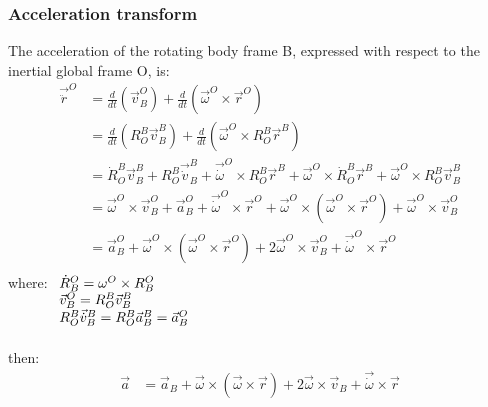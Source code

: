 \documentclass[12pt]{article}
\begin{document}
        \subsubsection{Acceleration transform}
            The acceleration of the rotating body frame B, expressed with respect to the inertial global frame O, is:
            \begin{equation}
                \begin{aligned}
                    \vec{\ddot{r}}^O & = \frac{d}{dt} \left(\vec{v}_B^O\right) + \frac{d}{dt} \left(\vec{\omega}^O \times \vec{r}^O\right) \\
                    & = \frac{d}{dt} \left(R^B_O \vec{v}_B^B\right) + \frac{d}{dt} \left(\vec{\omega}^O \times R^B_O \vec{r}^B\right) \\
                    & = \dot{R}^B_O \vec{v}_B^B + R^B_O \vec{\dot{v}}_B^B + \vec{\dot{\omega}}^O \times R^B_O \vec{r}^B + \vec{\omega}^O \times \dot{R}^B_O \vec{r}^B + \vec{\omega}^O \times R^B_O \vec{v}_B^B \\
                    & = \vec{\omega}^O \times \vec{v}_B^O + \vec{a}_B^O + \vec{\dot{\omega}}^O \times \vec{r}^O + \vec{\omega}^O \times (\vec{\omega}^O \times \vec{r}^O) + \vec{\omega}^O \times \vec{v}^O_B \\
                    & = \vec{a}_B^O + \vec{\omega}^O \times (\vec{\omega}^O \times \vec{r}^O) + 2 \vec{\omega}^O \times \vec{v}_B^O + \vec{\dot{\omega}}^O \times \vec{r}^O \\
                \end{aligned}
            \end{equation}
            where:  $ \begin{array}[t]{l}
                        \dot{R}^O_B = \omega^O \times R^O_B \\
                        \vec{v}_B^O = R_O^B \vec{v}_B^B \\
                        R^B_O \vec{\dot{v}}_B^B = R^B_O \vec{a}_B^B = \vec{a}_B^O
                    \end{array} $ \\
                \\
            then:
            \begin{equation}
                \begin{aligned}
                    \vec{a} & = \vec{a}_B + \vec{\omega} \times (\vec{\omega} \times \vec{r}) + 2 \vec{\omega} \times \vec{v}_B + \vec{\dot{\omega}} \times \vec{r} \\
                \end{aligned}
            \end{equation}
\end{document}
